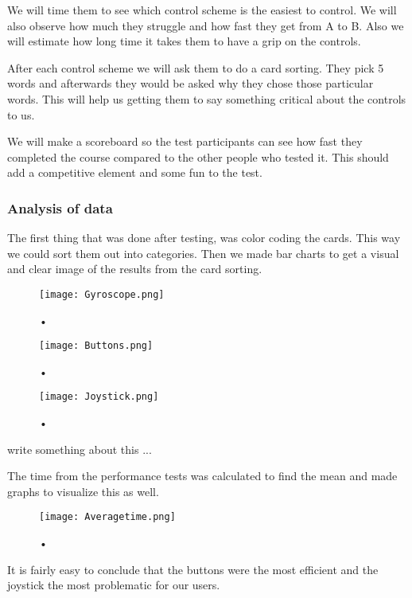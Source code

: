 We will time them to see which control scheme is the easiest to control. We will also observe how much they struggle and how fast they get from A to B. Also we will estimate how long time it takes them to have a grip on the controls.

After each control scheme we will ask them to do a card sorting. They pick 5 words and afterwards they would be asked why they chose those particular words. This will help us getting them to say something critical about the controls to us. 

We will make a scoreboard so the test participants can see how fast they completed the course compared to the other people who tested it.
This should add a competitive element and some fun to the test.

\subsubsection{Analysis of data}

The first thing that was done after testing, was color coding the cards. This way we could sort them out into categories. 
Then we made bar charts to get a visual and clear image of the results from the card sorting.

\begin{figure}[H]
\centering
\texttt{[image: Gyroscope.png]}
\caption{•}
\end{figure}

\begin{figure}[H]
\centering
\texttt{[image: Buttons.png]}
\caption{•}
\end{figure}

\begin{figure}[H]
\centering
\texttt{[image: Joystick.png]}
\caption{•}
\end{figure}

write something about this ...

The time from the performance tests was calculated to find the mean and made graphs to visualize this as well. 

\begin{figure}[H]
\centering
\texttt{[image: Averagetime.png]}
\caption{•}
\end{figure}

It is fairly easy to conclude that the buttons were the most efficient and the joystick the most problematic for our users. 


